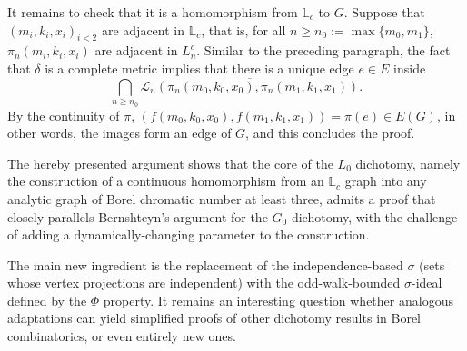 \documentclass[12pt]{article}
\begin{document}
It remains to check that it is a homomorphism from $\mathbb L_c$ to $G$.
Suppose that $(m_i,k_i,x_i)_{i<2}$ are adjacent in $\mathbb L_c$, that is, for all $n\geq n_0:=\max\{m_0,m_1\}$, $\pi_n(m_i,k_i,x_i)$ are adjacent in $L_n^c$.
Similar to the preceding paragraph, the fact that $\delta$ is a complete metric implies that there is a unique edge $e\in E$ inside $$\bigcap_{n\geq n_0}\overline{\mathcal L_n(\pi_n(m_0,k_0,x_0),\pi_n(m_1,k_1,x_1))}.$$
By the continuity of $\pi$, $(f(m_0,k_0,x_0),f(m_1,k_1,x_1))=\pi(e)\in E(G)$, in other words, the images form an edge of $G$, and this concludes the proof.

The hereby presented argument shows that the core of the $L_0$ dichotomy, namely the construction of a continuous homomorphism from an $\mathbb{L}_c$ graph into any analytic graph of Borel chromatic number at least three, admits a proof that closely parallels Bernshteyn's argument for the $G_0$ dichotomy, with the challenge of adding a dynamically-changing parameter to the construction.

The main new ingredient is the replacement of the independence-based $\sigma$ (sets whose vertex projections are independent) with the odd-walk-bounded $\sigma$-ideal defined by the $\Phi$ property.
It remains an interesting question whether analogous adaptations can yield simplified proofs of other dichotomy results in Borel combinatorics, or even entirely new ones.

\nocite{*}


\end{document}
